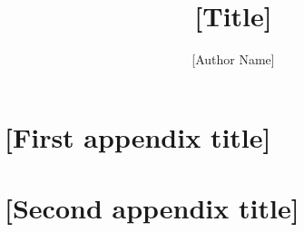 \documentclass[twoside,thesis]{npsreport2018}
\title{[Title]}
\author{[Author Name]}
\begin{document}
\NPScover                  %
\NPSsftne                  %
\NPSthesistitle            %
\NPSabstractpage           %
\NPSfrontmatter            %

\renewcommand{\chaptermark}[1]{\markboth{\MakeUppercase{\chaptername}\ \thechapter.\ #1}{}}

%
%
\NPStableOfContents
\NPSlistOfFigures
\NPSlistOfTables
{}

%
%
\NPSexecsummary{%
\lipsum[1-4] %
}

%
%
\NPSacknowledgements{%
\lipsum[1-3] %
}

\NPSbody


%

%
%


%
\NPSappendices
\chapter{[First appendix title]}

\chapter{[Second appendix title]}


%


%
%
\NPSend
\end{document}
